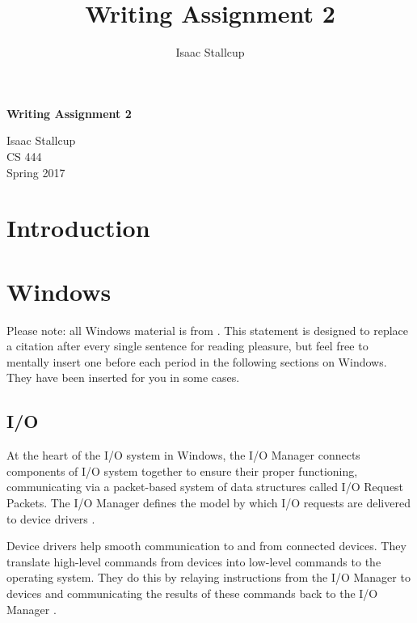 \documentclass[10pt,draftclsnofoot,onecolumn,compsoc]{IEEEtran}
\author{Isaac Stallcup}
\title{Writing Assignment 2}
\begin{document}
	
	\begin{titlepage}
		
		\begin{center}

		\fontsize{20pt}{20pt}\selectfont
				
		\vspace*{3.5cm}
	
		\textbf{Writing Assignment 2}\\
		
		\vspace{0.5cm}
		
		\fontsize{16pt}{16pt}\selectfont
		
		Isaac Stallcup \\
		CS 444\\
		Spring 2017\\
		

		\end{center}
	
	\end{titlepage}
	
	\section{Introduction}
	
	
	\section{Windows}
	
	Please note: all Windows material is from \cite{WInternals}. This statement is designed to replace a citation \cite{WInternals} after every single sentence for reading pleasure, but feel free to mentally insert one before each period in the following sections on Windows. They have been inserted for you in some cases.
	
	\subsection{I/O}
	
	At the heart of the I/O system in Windows, the I/O Manager connects components of I/O system together to ensure their proper functioning, communicating via a packet-based system of data structures called I/O Request Packets. The I/O Manager defines the model by which I/O requests are delivered to device drivers \cite{WInternals}.
	
	Device drivers help smooth communication to and from connected devices. They translate high-level commands from devices into low-level commands to the operating system. They do this by relaying instructions from the I/O Manager to devices and communicating the results of these commands back to the I/O Manager \cite{WInternals}.
	
\end{document}
